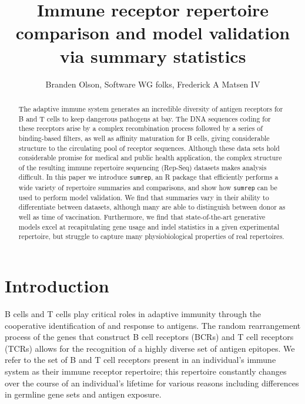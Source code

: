 \documentclass{article}
\title{Immune receptor repertoire comparison and model validation via summary statistics}
\author{Branden Olson, Software WG folks, Frederick A Matsen IV}
\begin{document}
\maketitle

\begin{abstract}
The adaptive immune system generates an incredible diversity of antigen receptors for B and T cells to keep dangerous pathogens at bay.
The DNA sequences coding for these receptors arise by a complex recombination process followed by a series of binding-based filters, as well as affinity maturation for B cells, giving considerable structure to the circulating pool of receptor sequences.
Although these data sets hold considerable promise for medical and public health application, the complex structure of the resulting immune repertoire sequencing (Rep-Seq) datasets makes analysis difficult.
In this paper we introduce \texttt{sumrep}, an R package that efficiently performs a wide variety of repertoire summaries and comparisons, and show how \texttt{sumrep} can be used to perform model validation.
We find that summaries vary in their ability to differentiate between datasets, although many are able to distinguish between donor as well as time of vaccination.
Furthermore, we find that state-of-the-art generative models excel at recapitulating gene usage and indel statistics in a given experimental repertoire, but struggle to capture many physiobiological properties of real repertoires.
\end{abstract}


\section*{Introduction}

B cells and T cells play critical roles in adaptive immunity through the cooperative identification of and response to antigens.
The random rearrangement process of the genes that construct B cell receptors (BCRs) and T cell receptors (TCRs) allows for the recognition of a highly diverse set of antigen epitopes.
We refer to the set of B and T cell receptors present in an individual's immune system as their immune receptor repertoire; this repertoire constantly changes over the course of an individual's lifetime for various reasons including differences in germline gene sets and antigen exposure.
\end{document}
